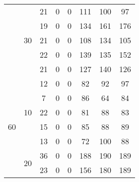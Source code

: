 \begin{table}[h]
\begin{tabular}{cc|c|c|c|c|c|c|}
\multicolumn{1}{|c|}{}                     & \multirow{5}{*}{30} & 21              & 0             & 0               & 111           & 100             & 97            \\ \cline{3-8} 
\multicolumn{1}{|c|}{}                     &                     & 19              & 0             & 0               & 134           & 161             & 176           \\ \cline{3-8} 
\multicolumn{1}{|c|}{}                     &                     & 21              & 0             & 0               & 108           & 134             & 105           \\ \cline{3-8} 
\multicolumn{1}{|c|}{}                     &                     & 22              & 0             & 0               & 139           & 135             & 152           \\ \cline{3-8} 
\multicolumn{1}{|c|}{}                     &                     & 21              & 0             & 0               & 127           & 140             & 126           \\ \hline
\multicolumn{1}{|c|}{\multirow{15}{*}{60}} & \multirow{5}{*}{10} & 12              & 0             & 0               & 82            & 92              & 97            \\ \cline{3-8} 
\multicolumn{1}{|c|}{}                     &                     & 7               & 0             & 0               & 86            & 64              & 84            \\ \cline{3-8} 
\multicolumn{1}{|c|}{}                     &                     & 22              & 0             & 0               & 81            & 88              & 83            \\ \cline{3-8} 
\multicolumn{1}{|c|}{}                     &                     & 15              & 0             & 0               & 85            & 88              & 89            \\ \cline{3-8} 
\multicolumn{1}{|c|}{}                     &                     & 13              & 0             & 0               & 72            & 100             & 88            \\ \cline{2-8} 
\multicolumn{1}{|c|}{}                     & \multirow{5}{*}{20} & 36              & 0             & 0               & 188           & 190             & 189           \\ \cline{3-8} 
\multicolumn{1}{|c|}{}                     &                     & 23              & 0             & 0               & 156           & 180             & 189           \\ \cline{3-8} 

\end{tabular}
\end{table}
